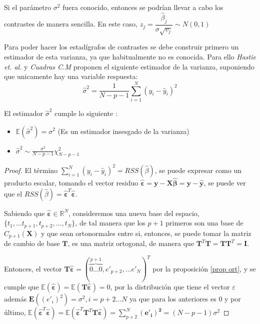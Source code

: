 \noindent Si el parámetro $\sigma^2$ fuera conocido, entonces se podrían llevar a cabo los contrastes de manera sencilla. En este caso, $z_j=\dfrac{\hat{\beta}_j}{\sigma \sqrt{v_j}}\sim N(0,1)$

\noindent Para poder hacer los estadígrafos de contrastes se debe construir primero un estimador de esta varianza, ya que habitualmente no es conocida. Para ello \emph{Hastie et. al.}\cite{Hastie 2001} y \emph{Cuadras C.M} \cite{Cuadras 2014} proponen el siguiente estimador de la varianza, suponiendo que unicamente hay una variable respuesta: 
\begin{equation}
\hat{\sigma}^2=\dfrac{1}{N-p-1}\sum_{i=1}^N (y_i-\hat{y}_i)^2 
\end{equation} 

\begin{propo}
El estimador $\hat{\sigma}^2$ cumple lo siguiente :
\begin{itemize}
\item $\mathbb{E}(\hat{\sigma} ^2)=\sigma^2$ (Es un estimador insesgado de la varianza)
\item  $\hat{\sigma}^2 \sim \frac{\sigma^2}{N-p-1}\chi_{N-p-1}^2 $
\end{itemize}
\begin{proof}
El término $\sum_{i=1}^N (y_i-\hat{y}_i)^2=RSS(\hat{\beta})$, se puede expresar como un producto escalar, tomando el vector residuo $\hat{\mathbf{\varepsilon}}= \mathbf{y}-\mathbf{X \hat{\beta}}=\mathbf{y}-\mathbf{\hat{y}}$, se puede ver que el $RSS(\hat{\beta})=\hat{\mathbf{\varepsilon}}^T\hat{\mathbf{\varepsilon}}$. 

\noindent Sabiendo que $\mathbf{\hat{\varepsilon}}\in \mathbb{R}^N$, consideremos una nueva base del espacio, $\lbrace t_1,\ldots t_{p+1},t_{p+2},\ldots, t_N \rbrace$, de tal manera que los $p+1$ primeros son una base de $C_{p+1}(\mathbf{X})$ y que sean ortonormales entre si, entonces, se puede tomar la matriz de cambio de base $\mathbf{T}$, es una matriz ortogonal, de manera que 
$\mathbf{T}^T\mathbf{T}=\mathbf{TT}^T=\mathbf{I}$. 

\noindent Entonces, el vector $\mathbf{T\hat{\varepsilon}}=(\overbrace{0\ldots 0}^{p+1},e'_{p+2},\ldots e'_{N})^T$ por la proposición \ref{prop ort}, y se cumple que $\mathbb{E}(\mathbf{\hat{\varepsilon}})=\mathbb{E}(\mathbf{T\hat{\varepsilon}})=0$, por la distribución que tiene el vector $\varepsilon$ además $\mathbf{E}((e'_i)^2)=\sigma^2, i=p+2\ldots N $ ya que para los anteriores es 0 y por último, $\mathbb{E}(\mathbf{\hat{\varepsilon}}^T\mathbf{\hat{\varepsilon}})=\mathbb{E}(\mathbf{\hat{\varepsilon}}^T\mathbf{T}^T\mathbf{T}\mathbf{\hat{\varepsilon}})=\sum_{p+2}^N \mathbf{(e'_i)^2}=(N-p-1) \sigma^2$


\end{proof}
\end{propo}
